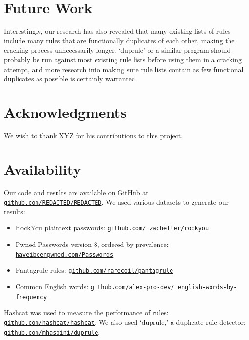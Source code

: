 \documentclass[letterpaper,twocolumn,10pt]{article}
\begin{document}
\section{Future Work}
\label{sec:future-work}



Interestingly, our research has also revealed that many existing lists of rules
include many rules that are functionally duplicates of each other, making the
cracking process unnecessarily longer. `duprule' or a similar program should
probably be run against most existing rule lists before using them in a cracking
attempt, and more research into making sure rule lists contain as few functional
duplicates as possible is certainly warranted.

\section*{Acknowledgments}

We wish to thank XYZ for his contributions to this project.

\section*{Availability}

Our code and results are available on GitHub at
\texttt{\href{https://github.com/REDACTED/REDACTED}
{github.com/REDACTED/REDACTED}}. We used various datasets
to generate our results:

\begin{itemize}
\item RockYou plaintext passwords:
\texttt{\href{https://github.com/zacheller/rockyou}
{github.com/ zacheller/rockyou}}
\item Pwned Passwords version 8, ordered by prevalence:
\texttt{\href{https://haveibeenpwned.com/Passwords}
{haveibeenpwned.com/Passwords}}
\item Pantagrule rules:
\texttt{\href{https://github.com/rarecoil/pantagrule}
{github.com/rarecoil/pantagrule}}
\item Common English words:
\texttt{\href{https://github.com/alex-pro-dev/english-words-by-frequency}
{github.com/alex-pro-dev/ english-words-by-frequency}}
\end{itemize}

Hashcat was used to measure the performance of rules:
\texttt{\href{https://github.com/hashcat/hashcat}{github.com/hashcat/hashcat}}.
We also used
`duprule,' a duplicate rule detector:
\texttt{\href{https://github.com/mhasbini/duprule}
{github.com/mhasbini/duprule}}.





\end{document}
